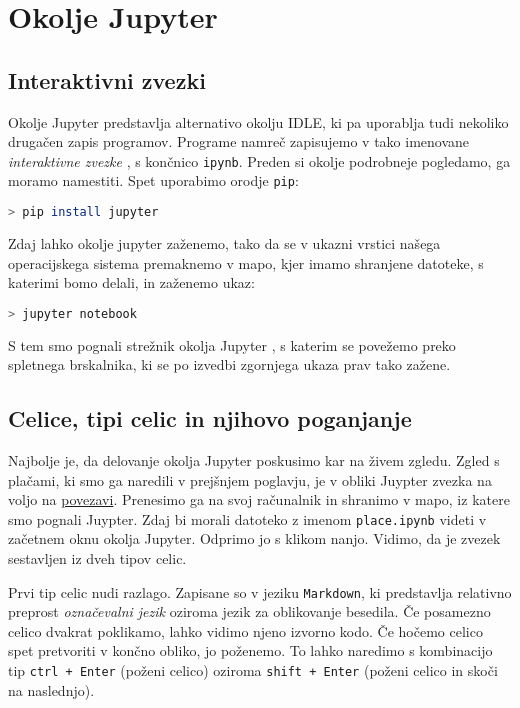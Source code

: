 \chapter{Okolje Jupyter}

\section{Interaktivni zvezki}
Okolje Jupyter predstavlja alternativo okolju IDLE, ki pa uporablja tudi nekoliko drugačen zapis programov. Programe namreč zapisujemo v tako imenovane \emph{interaktivne zvezke} , s končnico \texttt{ipynb}. Preden si okolje podrobneje pogledamo, ga moramo namestiti. Spet uporabimo orodje \texttt{pip}:
\begin{lstlisting}[language=bash]
> pip install jupyter
\end{lstlisting}
Zdaj lahko okolje jupyter zaženemo, tako da se v ukazni vrstici našega operacijskega sistema premaknemo v mapo, kjer imamo shranjene datoteke, s katerimi bomo delali, in zaženemo ukaz:
\begin{lstlisting}[language=bash]
> jupyter notebook
\end{lstlisting}
S tem smo pognali strežnik okolja Jupyter , s katerim se povežemo preko spletnega brskalnika, ki se po izvedbi zgornjega ukaza prav tako zažene. 

\section{Celice, tipi celic in njihovo poganjanje}
Najbolje je, da delovanje okolja Jupyter poskusimo kar na živem zgledu. Zgled s plačami, ki smo ga naredili v prejšnjem poglavju, je v obliki Juypter zvezka na voljo na \href{https://raw.githubusercontent.com/mmoskon/OP_skripta/master/resitve/place.ipynb}{povezavi}. Prenesimo ga na svoj računalnik in shranimo v mapo, iz katere smo pognali Juypter. Zdaj bi morali datoteko z imenom \texttt{place.ipynb} videti v začetnem oknu okolja Jupyter. Odprimo jo s klikom nanjo. Vidimo, da je zvezek sestavljen iz dveh tipov celic. 

Prvi tip celic nudi razlago. Zapisane so v jeziku \texttt{Markdown}, ki predstavlja relativno preprost \emph{označevalni jezik} oziroma jezik za oblikovanje besedila. Če posamezno celico dvakrat poklikamo, lahko vidimo njeno izvorno kodo. Če hočemo celico spet pretvoriti v končno obliko, jo poženemo. To lahko naredimo s kombinacijo tip \texttt{ctrl + Enter} (poženi celico) oziroma \texttt{shift + Enter} (poženi celico in skoči na naslednjo).

